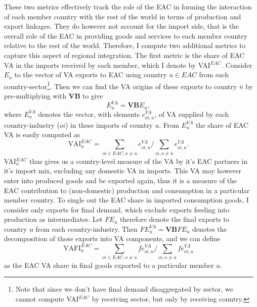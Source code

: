 \documentclass[a4paper]{article}
\begin{document}
These two metrics effectively track the role of the EAC in forming the interaction of each member country with the rest of the world in terms of production and export linkages. They do however not account for the import side, that is the overall role of the EAC in providing goods and services to each member country relative to the rest of the world. Therefore, I compute two additional metrics to capture this aspect of regional integration. The first metric is the share of EAC VA in the imports received by each member, which I denote by VAI$^{EAC}$. Consider $E_u$ to the vector of VA exports to EAC using country $u \in EAC$ from each country-sector\footnote{Note that since we don't have final demand disaggregated by sector, we cannot compute VAI$^{EAC}$ by receiving sector, but only by receiving country.}.%
Then we can find the VA origins of these exports to country $u$ by pre-multiplying with \textbf{VB} to give 
\begin{equation}
E_u^{VA} = \textbf{VB}E_u,
\end{equation}
 where $E_u^{VA}$ denotes the vector, with elements $e_{oi, u}^{VA}$, of VA supplied by each country-industry ($oi$) in these imports of country $u$. From  $E_u^{VA}$ the share of EAC VA is easily computed as 
\begin{equation}
\text{VAI}_u^{EAC} = \sum_{oi \in EAC, o \neq u}  e_{oi, u}^{VA}  \bigg/ \sum_{oi, o \neq u}  e_{oi, u}^{VA}.  
\end{equation}
VAI$_u^{EAC}$ thus gives us a country-level measure of the VA by it's EAC partners in it's import mix, excluding any domestic VA in imports. This VA may however enter into produced goods and be exported again, thus it is a measure of the EAC contribution to (non-domestic) production and consumption in a particular member country. To single out the EAC share in imported consumption goods, I consider only exports for final demand, which exclude exports feeding into production as intermediates. Let $FE_u$ therefore denote the final exports to country $u$ from each country-industry. Then $FE_u^{VA} = \textbf{VB}FE_u$ denotes the decomposition of those exports into VA components, and we can define 
\begin{equation}
\text{VAFI}_{u}^{EAC} = \sum_{oi \in EAC, o \neq u}  fe_{oi, u}^{VA}  \bigg/ \sum_{oi, o \neq u}  fe_{oi, u}^{VA}
\end{equation}
as the EAC VA share in final goods exported to a particular member $u$. 
\end{document}
